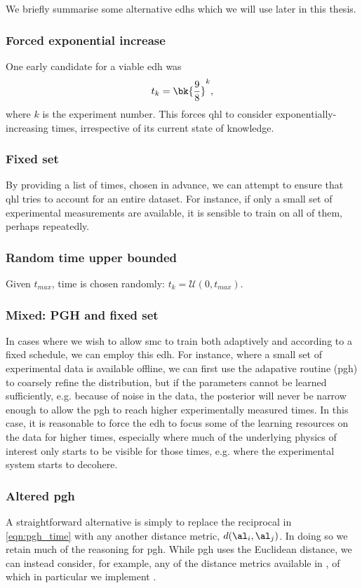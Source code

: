 
We briefly summarise some alternative \gls{edh}s which we will use later in this thesis. 
\subsubsection{Forced exponential increase}
One early candidate for a viable \gls{edh} was 
\begin{equation}
    t_k = \bk{\frac{9}{8}}^k, 
\end{equation}
    where $k$ is the experiment number. 
This forces \gls{qhl} to consider exponentially-increasing times, irrespective of its current state of knowledge. 

\subsubsection{Fixed set}
By providing a list of times, chosen in advance, we can attempt to ensure that \gls{qhl} tries to account for 
    an entire dataset. 
For instance, if only a small set of experimental measurements are available, 
    it is sensible to train on all of them, perhaps repeatedly. 

\subsubsection{Random time upper bounded}
    Given $t_{max}$, time is chosen randomly: $t_k = \mathcal{U}(0, t_{max})$. 
    
\subsubsection{Mixed: PGH and fixed set}
In cases where we wish to allow \gls{smc} to train both adaptively and according to a fixed schedule,
    we can employ this \gls{edh}. 
For instance, where a small set of experimental data is available offline, 
    we can first use the adapative routine (\gls{pgh}) to coarsely refine the distribution, 
    but if the parameters cannot be learned sufficiently, e.g. because of noise in the data, 
    the posterior will never be narrow enough to allow the \gls{pgh} to reach higher 
    experimentally measured times. 
In this case, it is reasonable to force the \gls{edh} to focus some of the learning 
    resources on the data for higher times, 
    especially where much of the underlying physics of interest only starts to be visible for those times, 
    e.g. where the experimental system starts to decohere. 

\subsubsection{Altered \gls{pgh}}
A straightforward alternative is simply to replace the reciprocal in \cref{eqn:pgh_time} with any another distance metric, 
    $d(\al_i, \al_j)$.
In doing so we retain much of the reasoning for \gls{pgh}. 
While \gls{pgh} uses the Euclidean distance, we can instead consider, for example, 
    any of the distance metrics available in  \cite{2020SciPy-NMeth}, 
    of which in particular we implement . 
        
